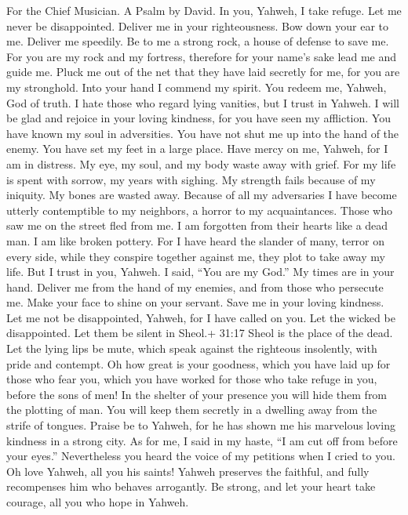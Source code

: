 For the Chief Musician. A Psalm by David.  In you, Yahweh, I
take refuge. Let me never be disappointed. Deliver me in your
righteousness.  Bow down your ear to me. Deliver me
speedily. Be to me a strong rock, a house of defense to save me.
 For you are my rock and my fortress, therefore for your
name's sake lead me and guide me.  Pluck me out of the net
that they have laid secretly for me, for you are my stronghold.
 Into your hand I commend my spirit. You redeem me, Yahweh,
God of truth.  I hate those who regard lying vanities, but I
trust in Yahweh.  I will be glad and rejoice in your loving
kindness, for you have seen my affliction. You have known my soul in
adversities.  You have not shut me up into the hand of the
enemy. You have set my feet in a large place.  Have mercy on
me, Yahweh, for I am in distress. My eye, my soul, and my body waste
away with grief.  For my life is spent with sorrow, my
years with sighing. My strength fails because of my iniquity. My bones
are wasted away.  Because of all my adversaries I have
become utterly contemptible to my neighbors, a horror to my
acquaintances. Those who saw me on the street fled from me.
 I am forgotten from their hearts like a dead man. I am
like broken pottery.  For I have heard the slander of many,
terror on every side, while they conspire together against me, they plot
to take away my life.  But I trust in you, Yahweh. I said,
``You are my God.''  My times are in your hand. Deliver me
from the hand of my enemies, and from those who persecute me.
 Make your face to shine on your servant. Save me in your
loving kindness.  Let me not be disappointed, Yahweh, for I
have called on you. Let the wicked be disappointed. Let them be silent
in Sheol.+ 31:17 Sheol is the place of the dead.  Let the
lying lips be mute, which speak against the righteous insolently, with
pride and contempt.  Oh how great is your goodness, which
you have laid up for those who fear you, which you have worked for those
who take refuge in you, before the sons of men!  In the
shelter of your presence you will hide them from the plotting of man.
You will keep them secretly in a dwelling away from the strife of
tongues.  Praise be to Yahweh, for he has shown me his
marvelous loving kindness in a strong city.  As for me, I
said in my haste, ``I am cut off from before your eyes.'' Nevertheless
you heard the voice of my petitions when I cried to you. 
Oh love Yahweh, all you his saints! Yahweh preserves the faithful, and
fully recompenses him who behaves arrogantly.  Be strong,
and let your heart take courage, all you who hope in Yahweh.

